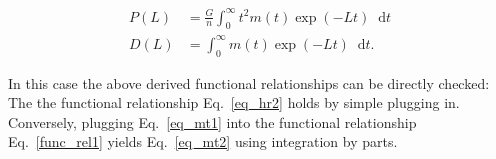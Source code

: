 \documentclass[11pt]{article}
\newcommand*\diff{\mathop{}\!\mathrm{d}}
\begin{document}
\begin{align}
P(L) &= \frac{G}{n}\int_{0}^{\infty} t^2 m(t) \exp(-Lt) \diff t \label{eq_mt1} \\
    D(L) &= \int_0^{\infty} m(t)\exp(-Lt) \diff t \text{.} \label{eq_mt2}
\end{align}

 In this case the above derived functional relationships can be directly checked:  The the functional relationship Eq.~\ref{eq_hr2} holds by simple plugging in. Conversely, plugging Eq.~\ref{eq_mt1} into the functional relationship Eq.~\ref{func_rel1} yields Eq.~\ref{eq_mt2} using integration by parts.
\end{document}
